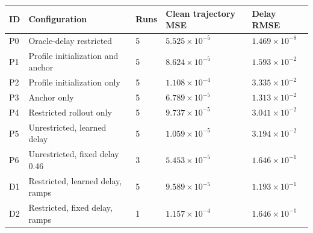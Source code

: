 \begin{tabular}{lllll}
\toprule
ID & Configuration & Runs & Clean trajectory MSE & Delay RMSE \\
\midrule
P0 & Oracle-delay restricted & 5 & \(5.525\times10^{-5}\) & \(1.469\times10^{-8}\) \\
P1 & Profile initialization and anchor & 5 & \(8.624\times10^{-5}\) & \(1.593\times10^{-2}\) \\
P2 & Profile initialization only & 5 & \(1.108\times10^{-4}\) & \(3.335\times10^{-2}\) \\
P3 & Anchor only & 5 & \(6.789\times10^{-5}\) & \(1.313\times10^{-2}\) \\
P4 & Restricted rollout only & 5 & \(9.737\times10^{-5}\) & \(3.041\times10^{-2}\) \\
P5 & Unrestricted, learned delay & 5 & \(1.059\times10^{-5}\) & \(3.194\times10^{-2}\) \\
P6 & Unrestricted, fixed delay 0.46 & 3 & \(5.453\times10^{-5}\) & \(1.646\times10^{-1}\) \\
D1 & Restricted, learned delay, ramps & 5 & \(9.589\times10^{-5}\) & \(1.193\times10^{-1}\) \\
D2 & Restricted, fixed delay, ramps & 1 & \(1.157\times10^{-4}\) & \(1.646\times10^{-1}\) \\
\bottomrule
\end{tabular}
